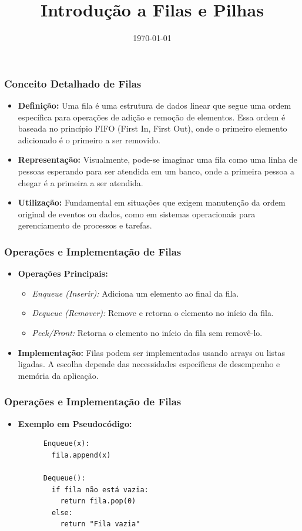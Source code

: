 \title{Introdução a Filas e Pilhas}
\date{\today}
\frame{\titlepage}
\begin{frame}[fragile]
  \frametitle{Conceito Detalhado de Filas}
  \begin{itemize}
    \item \textbf{Definição:} Uma fila é uma estrutura de dados linear que segue uma ordem específica para operações de adição e remoção de elementos. Essa ordem é baseada no princípio FIFO (First In, First Out), onde o primeiro elemento adicionado é o primeiro a ser removido.
    \item \textbf{Representação:} Visualmente, pode-se imaginar uma fila como uma linha de pessoas esperando para ser atendida em um banco, onde a primeira pessoa a chegar é a primeira a ser atendida.
    \item \textbf{Utilização:} Fundamental em situações que exigem manutenção da ordem original de eventos ou dados, como em sistemas operacionais para gerenciamento de processos e tarefas.
  \end{itemize}
\end{frame}

\begin{frame}[fragile]
  \frametitle{Operações e Implementação de Filas}
  \begin{itemize}
    \item \textbf{Operações Principais:}
      \begin{itemize}
        \item \textit{Enqueue (Inserir):} Adiciona um elemento ao final da fila.
        \item \textit{Dequeue (Remover):} Remove e retorna o elemento no início da fila.
        \item \textit{Peek/Front:} Retorna o elemento no início da fila sem removê-lo.
      \end{itemize}
    \item \textbf{Implementação:} Filas podem ser implementadas usando arrays ou listas ligadas. A escolha depende das necessidades específicas de desempenho e memória da aplicação.
  \end{itemize}
\end{frame}

\begin{frame}[fragile]
  \frametitle{Operações e Implementação de Filas}
  \begin{itemize}
    
    \item \textbf{Exemplo em Pseudocódigo:}
      \begin{verbatim}
      Enqueue(x):
        fila.append(x)
      
      Dequeue():
        if fila não está vazia:
          return fila.pop(0)
        else:
          return "Fila vazia"
      \end{verbatim}
  \end{itemize}
\end{frame}


